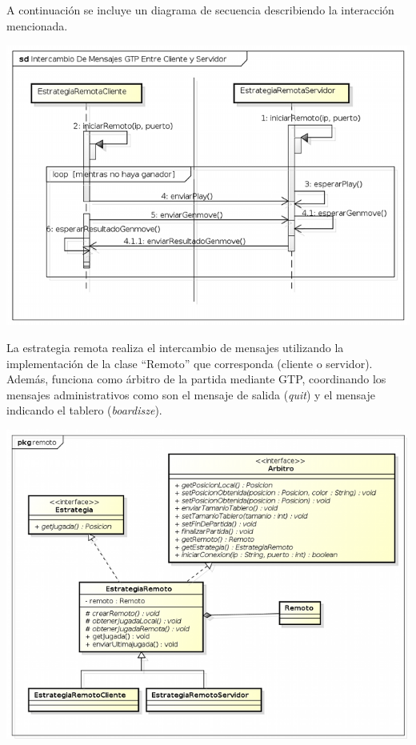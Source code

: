 \documentclass[11pt]{article}
\begin{document}
A continuaci\'on se incluye un diagrama de secuencia describiendo la interacci\'on mencionada.

\begin{center}
 \includegraphics[scale=0.9]{./Diagramas/DiagramaRemoto/secuencia_estrategiaRemoto.png}
\end{center}

La estrategia remota realiza el intercambio de mensajes utilizando la implementaci\'on de la clase ``Remoto'' que corresponda (cliente o servidor).
Adem\'as, funciona como \'arbitro de la partida mediante GTP, coordinando los mensajes administrativos
como son el mensaje de salida (\textit{quit}) y el mensaje indicando el tablero (\textit{boardisze}).

\begin{center}
 \includegraphics[scale=1.0]{./Diagramas/DiagramaRemoto/diagrama_estrategiaRemoto.png}
\end{center}
\end{document}
